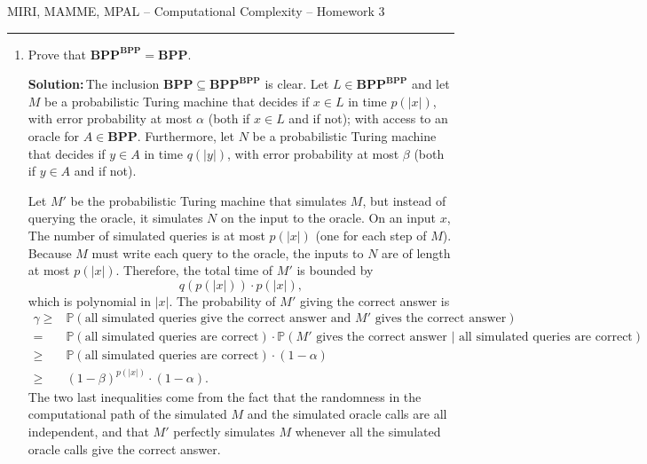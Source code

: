 \documentclass{amsart}
\theoremstyle{plain}
\theoremstyle{definition}
\newcommand{\bpp}{\textbf{BPP}}
\newcommand{\sol}{\textbf{Solution:\,}}
\begin{document}
    {\Large MIRI, MAMME, MPAL -- Computational Complexity -- Homework 3}

    \vspace{0.5cm}

    \hrule

    \vspace{0.5cm}

    \begin{enumerate}[label=\textbf{Exercise \arabic*:}, leftmargin=0cm, labelwidth=-0.2cm, align=left]

        \item Prove that $\bpp^{\bpp} = \bpp$.

            \sol The inclusion $\bpp \subseteq \bpp^{\bpp}$ is clear.
            Let $L \in \bpp^{\bpp}$ and let $M$ be a probabilistic Turing machine
            that decides if $x \in L$
            in time $p(|x|)$, with error probability at most $\alpha$
            (both if $x \in L$ and if not);
            with access to an oracle for
            $A \in \bpp$.
            Furthermore, let $N$ be a probabilistic Turing machine that decides if $y \in A$
            in time $q(|y|)$,
            with error probability at most $\beta$
            (both if $y \in A$ and if not).

            Let $M'$ be the probabilistic Turing machine that simulates $M$,
            but instead of querying the oracle, it simulates $N$ on the input
            to the oracle.
            On an input $x$,
            The number of simulated queries is at most $p(|x|)$
            (one for each step of $M$).
            Because $M$ must write each query to the oracle,
            the inputs to $N$ are of length at most $p(|x|)$.
            Therefore, the total time of $M'$ is bounded by
            \[
               q(p(|x|)) \cdot p(|x|),
            \]
            which is polynomial in $|x|$.
            The probability of $M'$ giving the correct answer is
            \begin{align*}
                \gamma \geq & \mathbb{P}(\text{all simulated queries give the correct answer and } M' \text{ gives the correct answer}) \\
                = & \mathbb{P}(\text{all simulated queries are correct}) \cdot \mathbb{P}(M' \text{ gives the correct answer } | \text{ all simulated queries are correct}) \\
                \geq & \mathbb{P}(\text{all simulated queries are correct}) \cdot (1 - \alpha) \\
                \geq & (1 - \beta)^{p(|x|)} \cdot (1 - \alpha).
            \end{align*}
            The two last inequalities come from the fact that the randomness in the computational path
            of the simulated $M$ and the simulated oracle calls are all independent, and that
            $M'$ perfectly simulates $M$ whenever all the simulated oracle calls give the correct answer.


\end{enumerate}
\end{document}
